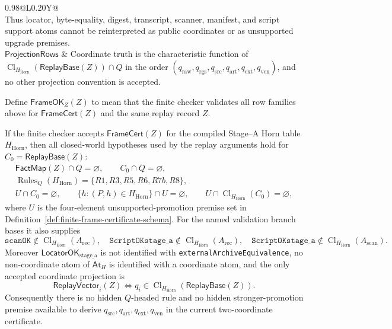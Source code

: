 \documentclass[runningheads]{llncs}
\DeclareRobustCommand{\stageAprose}{Stage--A}
\newcommand{\LocatorOKstageA}{\mathsf{LocatorOK}_{\mathrm{stage\_a}}}
\newcommand{\FactMap}{\mathsf{FactMap}}
\newcommand{\AtH}{\mathsf{At}_{H}}
\newcommand{\ReplayVector}{\mathsf{ReplayVector}}
\newcommand{\ReplayBase}{\mathsf{ReplayBase}}
\newcommand{\FrameOKZ}{\mathsf{FrameOK}_{Z}}
\newcommand{\FrameCert}{\mathsf{FrameCert}}
\newcommand{\rawBeginTokenCoord}{q_{\mathrm{raw}}}
\newcommand{\qlex}{\rawBeginTokenCoord}
\newcommand{\qrgs}{q_{\mathrm{rgs}}}
\newcommand{\qsrc}{q_{\mathrm{src}}}
\newcommand{\qart}{q_{\mathrm{art}}}
\newcommand{\qext}{q_{\mathrm{ext}}}
\newcommand{\qven}{q_{\mathrm{ven}}}
\newcommand{\HHorn}{H_{\mathrm{Horn}}}
\newcommand{\ClHHorn}{\operatorname{Cl}_{\HHorn}}
\begin{document}
\begin{definition}
\begin{center}
\begin{tabularx}{0.98\linewidth}{@{}L{0.20\linewidth}Y@{}}
\[\]
Thus locator, byte-equality, digest, transcript, scanner, manifest, and script
support atoms cannot be reinterpreted as public coordinates or as unsupported
upgrade premises.\\
\addlinespace
\(\mathsf{ProjectionRows}\) &
Coordinate truth is the characteristic function of
\(\ClHHorn(\ReplayBase(Z))\cap Q\) in the order
\((\qlex,\qrgs,\qsrc,\qart,\qext,\qven)\), and no other projection convention is
accepted.\\
\bottomrule
\end{tabularx}
\end{center}
Define \(\FrameOKZ(Z)\) to mean that the finite checker validates all row
families above for \(\FrameCert(Z)\) and the same replay record \(Z\).
\end{definition}

\begin{theorem}
\label{thm:frame-certificate-checker}
If the finite checker accepts \(\FrameCert(Z)\) for the compiled
\stageAprose{} Horn table \(\HHorn\), then all closed-world hypotheses used by
the replay arguments hold for \(C_0=\ReplayBase(Z)\):
\[
\begin{gathered}
\FactMap(Z)\cap Q=\varnothing,\qquad C_0\cap Q=\varnothing,\\
\operatorname{Rules}_Q(\HHorn)=\{R1,R3,R5,R6,R7b,R8\},\\
U\cap C_0=\varnothing,\qquad
\{h:(P,h)\in\HHorn\}\cap U=\varnothing,\qquad
U\cap\ClHHorn(C_0)=\varnothing,
\end{gathered}
\]
where \(U\) is the four-element unsupported-promotion premise set in
Definition~\ref{def:finite-frame-certificate-schema}.  For the named validation
branch bases it also supplies
\[
\texttt{scanOK}\notin\ClHHorn(A_{\mathrm{rec}}),\quad
\texttt{ScriptOKstage\_a}\notin\ClHHorn(A_{\mathrm{rec}}),\quad
\texttt{ScriptOKstage\_a}\notin\ClHHorn(A_{\mathrm{scan}}).
\]
Moreover
\(\LocatorOKstageA\) is not identified with
\texttt{externalArchiveEquivalence}, no non-coordinate atom of \(\AtH\) is
identified with a coordinate atom, and the only accepted coordinate projection is
\[
\ReplayVector_i(Z)\Longleftrightarrow
q_i\in\ClHHorn(\ReplayBase(Z)).
\]
Consequently there is no hidden \(Q\)-headed rule and no hidden stronger-promotion premise
available to derive \(\qsrc,\qart,\qext,\qven\) in the current two-coordinate
certificate.
\end{theorem}
\end{document}

